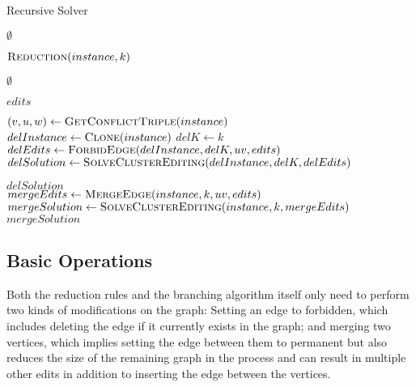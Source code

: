 \documentclass{article}
\begin{document}
\begin{algorithm}
\caption{Recursive Solver}
\label{alg:solver}
\begin{algorithmic}

		\State \Return $\emptyset$
	\EndIf

	\State $\Call{Reduction}{instance, k}$

		\State \Return $\emptyset$
	\EndIf

		\State \Return $edits$
	\EndIf

	\State $(v, u, w) \gets \Call{GetConflictTriple}{instance}$
	\\
	\State $delInstance \gets \Call{Clone}{instance}$
	\State $delK \gets k$
	\State $delEdits \gets \Call{ForbidEdge}{delInstance, delK, uv, edits}$
	\State $delSolution \gets \Call{SolveClusterEditing}{delInstance, delK, delEdits}$

		\State \Return $delSolution$
	\EndIf
	\\
	\State $mergeEdits \gets \Call{MergeEdge}{instance, k, uv, edits}$
	\State $mergeSolution \gets \Call{SolveClusterEditing}{instance, k, mergeEdits}$
	\State \Return $mergeSolution$
\EndFunction

\end{algorithmic}
\end{algorithm}

\subsection{Basic Operations}

Both the reduction rules and the branching algorithm itself only need to perform two kinds of
modifications on the graph: Setting an edge to forbidden, which includes deleting the edge if it
currently exists in the graph; and merging two vertices, which implies setting the edge between them
to permanent but also reduces the size of the remaining graph in the process and can result in
multiple other edits in addition to inserting the edge between the vertices.

\end{document}
